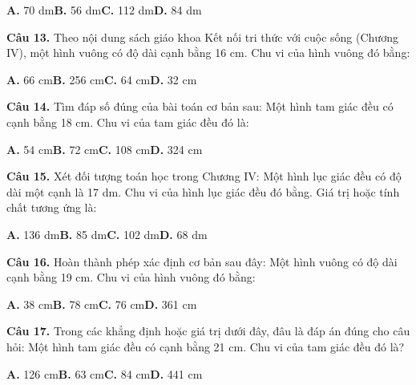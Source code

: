 \documentclass[11pt,a4paper]{article}
\begin{document}
\hspace*{1.5em}\textbf{A.} 70 dm\quad\quad \textbf{B.} 56 dm\quad\quad \textbf{C.} 112 dm\quad\quad \textbf{D.} 84 dm\par\vspace{2pt}
\textbf{\color{primary} Câu 13.} Theo nội dung sách giáo khoa Kết nối tri thức với cuộc sống (Chương IV), một hình vuông có độ dài cạnh bằng 16 cm. Chu vi của hình vuông đó bằng:\par
\hspace*{1.5em}\textbf{A.} 66 cm\quad\quad \textbf{B.} 256 cm\quad\quad \textbf{C.} 64 cm\quad\quad \textbf{D.} 32 cm\par\vspace{2pt}
\textbf{\color{primary} Câu 14.} Tìm đáp số đúng của bài toán cơ bản sau: Một hình tam giác đều có cạnh bằng 18 cm. Chu vi của tam giác đều đó là:\par
\hspace*{1.5em}\textbf{A.} 54 cm\quad\quad \textbf{B.} 72 cm\quad\quad \textbf{C.} 108 cm\quad\quad \textbf{D.} 324 cm\par\vspace{2pt}
\textbf{\color{primary} Câu 15.} Xét đối tượng toán học trong Chương IV: Một hình lục giác đều có độ dài một cạnh là 17 dm. Chu vi của hình lục giác đều đó bằng. Giá trị hoặc tính chất tương ứng là:\par
\hspace*{1.5em}\textbf{A.} 136 dm\quad\quad \textbf{B.} 85 dm\quad\quad \textbf{C.} 102 dm\quad\quad \textbf{D.} 68 dm\par\vspace{2pt}
\textbf{\color{primary} Câu 16.} Hoàn thành phép xác định cơ bản sau đây: Một hình vuông có độ dài cạnh bằng 19 cm. Chu vi của hình vuông đó bằng:\par
\hspace*{1.5em}\textbf{A.} 38 cm\quad\quad \textbf{B.} 78 cm\quad\quad \textbf{C.} 76 cm\quad\quad \textbf{D.} 361 cm\par\vspace{2pt}
\textbf{\color{primary} Câu 17.} Trong các khẳng định hoặc giá trị dưới đây, đâu là đáp án đúng cho câu hỏi: Một hình tam giác đều có cạnh bằng 21 cm. Chu vi của tam giác đều đó là?\par
\hspace*{1.5em}\textbf{A.} 126 cm\quad\quad \textbf{B.} 63 cm\quad\quad \textbf{C.} 84 cm\quad\quad \textbf{D.} 441 cm\par\vspace{2pt}
\end{document}
